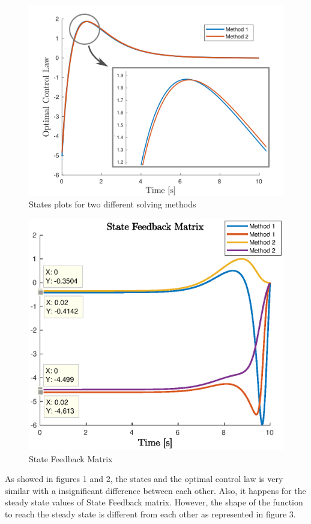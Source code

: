 \documentclass{article}
\begin{document}
\begin{center} \begin{figure} 
\includegraphics [width=4.5in]{controllaw.png}
\caption{States plots for two different solving methods}
\end{figure}  \end{center}

\begin{center} \begin{figure}[h]
\includegraphics [width=4.5in]{SFM.eps}
\caption{State Feedback Matrix}
\end{figure}  \end{center}

As showed in figures 1 and 2, the states and the optimal control law is very similar with a insignificant difference between each other. Also, it happens for the steady state values of State Feedback matrix. However, the shape of the function to reach the steady state is different from each other as represented in figure 3.
\end{document}
